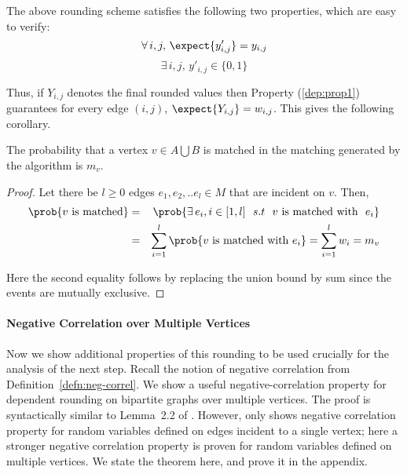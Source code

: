 The above rounding scheme satisfies the following two properties, which are easy to verify:
\begin{equation}
\label{dep:prop1}
\forall \,i,j,\, \expect{y'_{i,j}}=y_{i,j}
\end{equation}
\begin{equation}
\label{dep:prop2}
\exists\,i,j,\, y'_{i,j}\in \{0,1\}
\end{equation}


Thus, if $Y_{i,j}$ denotes the final rounded values then Property (\ref{dep:prop1}) guarantees for every edge $(i,j)$,  $\expect{Y_{i,j}}=w_{i,j}$. This gives the following corollary.



\begin{corollary}
\label{cor:match1}
The probability that a vertex $v \in A \bigcup B$ is matched in the matching generated by the algorithm is $m_v$.
\end{corollary}

\begin{proof}
Let there be $l \geq 0$ edges $e_1,e_2,..e_l \in M$ that are incident on $v$. Then,
\begin{eqnarray*}
\prob{v~ \text{is matched}}&=&\prob{\exists\, e_i, i \in [1,l]~~ s.t~~ v~\text{is matched with }~e_i}\\
&=&\sum_{i=1}^{l} \prob{ v \text{ is matched with } e_{i}}=\sum_{i=1}^{l} w_{i}=m_{v}
\end{eqnarray*}

Here the second equality follows by replacing the union bound by sum since the events are mutually exclusive.
\end{proof}

\paragraph*{Negative Correlation over Multiple Vertices} 
Now we show additional properties of this rounding to be used crucially for the analysis of the next step.
Recall the notion of negative correlation from Definition~\ref{defn:neg-correl}.
We show a useful negative-correlation property for dependent rounding on bipartite graphs over multiple vertices. The proof is syntactically similar to Lemma~2.2 of \cite{gkps:dep-round}. However, \cite{gkps:dep-round} only shows negative correlation property for random variables defined on edges incident to a single vertex; here a stronger negative correlation property is proven for random variables defined on multiple vertices. We state the theorem here, and prove it in the appendix. 



